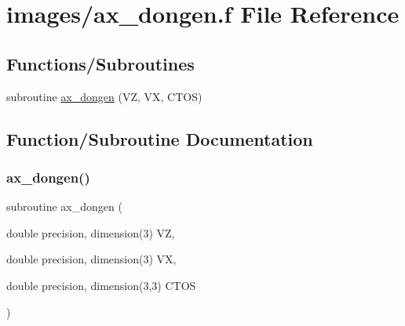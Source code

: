 \hypertarget{ax__dongen_8f}{}\section{images/ax\+\_\+dongen.f File Reference}
\label{ax__dongen_8f}
\subsection*{Functions/\+Subroutines}
\begin{DoxyCompactItemize}
\item 
subroutine \hyperlink{ax__dongen_8f_a785818c6537853b40605315677bfc68c}{ax\+\_\+dongen} (VZ, VX, C\+T\+OS)
\end{DoxyCompactItemize}


\subsection{Function/\+Subroutine Documentation}
\mbox{\label{ax__dongen_8f_a785818c6537853b40605315677bfc68c}} 
\subsubsection{\texorpdfstring{ax\+\_\+dongen()}{ax\_dongen()}}
{\footnotesize\ttfamily subroutine ax\+\_\+dongen (\begin{DoxyParamCaption}\item[{double precision, dimension(3)}]{VZ,  }\item[{double precision, dimension(3)}]{VX,  }\item[{double precision, dimension(3,3)}]{C\+T\+OS }\end{DoxyParamCaption})}

